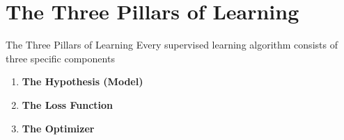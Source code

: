 \section{The Three Pillars of Learning}
\begin{frame}{The Three Pillars of Learning}
    Every supervised learning algorithm consists of three specific components
    \vspace{1em}
    \begin{enumerate}
        \item \textbf{The Hypothesis (Model)}
        \item \textbf{The Loss Function}
        \item \textbf{The Optimizer}
    \end{enumerate}
    \vspace{1em}
    
\end{frame}

